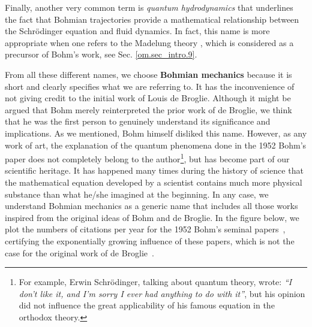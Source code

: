 \documentclass[nofootinbib, secnumarabic, amsmath, nobibnotes,11pt,aps,pra, floatfix]{revtex4-1}
\newcommand{\sref}[1]{Sec. \ref{#1}}
\begin{document}
Finally, another very common term is \emph{quantum hydrodynamics} \cite{om.wyatt2005} that underlines the fact that Bohmian trajectories provide a mathematical relationship between the Schr\"odinger equation and fluid dynamics. In fact, this name is more appropriate when one refers to the Madelung theory \cite{om.Madelung}, which is considered as a precursor of Bohm's work, see \sref{om.sec_intro.9}.

From all these different names, we choose \textbf{Bohmian mechanics} because it is short and clearly specifies what we are referring to. It has the inconvenience of not giving credit to the initial work of Louis de Broglie.
Although it might be argued that Bohm merely reinterpreted the prior work of de Broglie, we think that he was the first person to genuinely understand its significance and implications. As we mentioned, Bohm himself disliked this name. However, as any work of art, the explanation of the quantum phenomena done in the 1952 Bohm's paper does not completely belong to the author\footnote{For example, Erwin Schr\"odinger, talking about quantum theory, wrote: \emph{``I don't like it, and I'm sorry I ever had anything to do with it''}, but his opinion did not influence the great applicability of his famous equation in the orthodox theory.}, but has become part of our scientific heritage. It has happened many times during the history of science that the mathematical equation developed by a scientist contains much more physical substance than what he/she imagined at the beginning. 
In any case, we understand Bohmian mechanics as a generic name that includes all those works inspired from the original ideas of Bohm and de Broglie. In the figure below, we plot the numbers of citations per year for the 1952 Bohm's seminal papers~\cite{om.bohm1952a,om.bohm1952b}, certifying the exponentially growing influence of these papers, which is not the case for the original work of de Broglie~\cite{om.debroglie1927b}.
\end{document}
